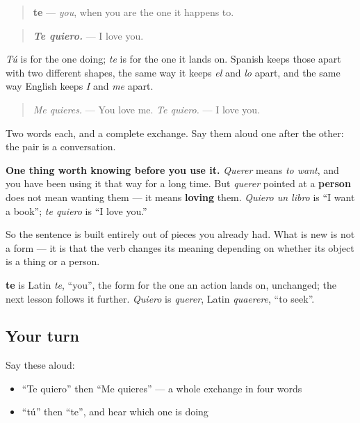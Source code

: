 \begin{grammarlens}[title={Grammar Lens: the partner of tú}]
\begin{quote}
\textbf{te} — \emph{you}, when you are the one it happens to.
\end{quote}

\begin{quote}
\emph{\textbf{Te quiero.}} — I love you.
\end{quote}

\emph{Tú} is for the one doing; \emph{te} is for the one it lands on. Spanish keeps those apart with two different shapes, the same way it keeps \emph{el} and \emph{lo} apart, and the same way English keeps \emph{I} and \emph{me} apart.

\begin{quote}
\emph{Me quieres.} — You love me. \emph{Te quiero.} — I love you.
\end{quote}

Two words each, and a complete exchange. Say them aloud one after the other: the pair is a conversation.

\textbf{One thing worth knowing before you use it.} \emph{Querer} means \emph{to want}, and you have been using it that way for a long time. But \emph{querer} pointed at a \textbf{person} does not mean wanting them — it means \textbf{loving} them. \emph{Quiero un libro} is \textquotedblleft{}I want a book\textquotedblright{}; \emph{te quiero} is \textquotedblleft{}I love you.\textquotedblright{}

So the sentence is built entirely out of pieces you already had. What is new is not a form — it is that the verb changes its meaning depending on whether its object is a thing or a person.
\end{grammarlens}

\begin{cousinweb}
\textbf{te} is Latin \emph{te}, \textquotedblleft{}you\textquotedblright{}, the form for the one an action lands on, unchanged; the next lesson follows it further. \emph{Quiero} is \emph{querer}, Latin \emph{quaerere}, \textquotedblleft{}to seek\textquotedblright{}.
\end{cousinweb}

\subsection*{Your turn}
Say these aloud:

\begin{itemize}
\raggedright
  \item \textquotedblleft{}Te quiero\textquotedblright{} then \textquotedblleft{}Me quieres\textquotedblright{} — a whole exchange in four words
  \item \textquotedblleft{}tú\textquotedblright{} then \textquotedblleft{}te\textquotedblright{}, and hear which one is doing
\end{itemize}

